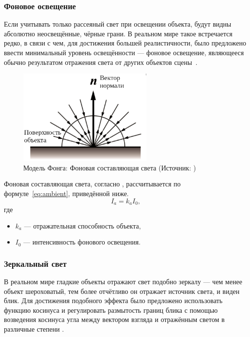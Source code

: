 \subsubsection*{Фоновое освещение}

Если учитывать только рассеяный свет при освещении объекта, будут видны абсолютно неосвещённые, чёрные грани.
В реальном мире такое встречается редко, в связи с чем, для достижения большей реалистичности, было предложено ввести минимальный уровень освещённости --- фоновое освещение, являющееся обычно результатом отражения света от других объектов сцены~\cite{phong, quakecon}.

\begin{figure}[H]
	\centering
	\includegraphics[width=0.6\textwidth]{img/ambient_ru}
    \caption{Модель Фонга: Фоновая составляющая света (Источник: \cite{phong})}
	\label{fig:ambient}
\end{figure}

Фоновая составляющая света, согласно \cite{phong}, рассчитывается по формуле~\ref{eq:ambient}, приведённой ниже.
\begin{equation}
    I_a = k_a I_0,
    \label{eq:ambient}
\end{equation}
где
\begin{itemize}
    \item $k_a$ --- отражательная способность объекта,
    \item $I_0$ --- интенсивность фонового освещения.
\end{itemize}

\subsubsection*{Зеркальный свет}

В реальном мире гладкие объекты отражают свет подобно зеркалу --- чем менее объект шероховатый, тем более отчётливо он отражает источник света, и виден блик.
Для достижения подобного эффекта было предложено использовать функцию косинуса и регулировать размытость границ блика с помощью возведения косинуса угла между вектором взгляда и отражённым светом в различные степени \cite{quakecon}.

